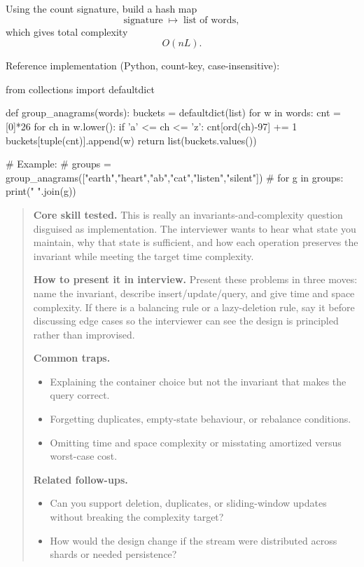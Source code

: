 \documentclass[11pt,letterpaper,openany]{book}
\newenvironment{EditorialNote}
  {\begin{quote}\small\setlength{\parskip}{0.25em}}
  {\end{quote}}
\newcommand{\QuestionSpacer}{\vspace{0.4em}}
\begin{document}
Using the count signature, build a hash map
\[
\text{signature} \;\mapsto\; \text{list of words},
\]
which gives total complexity
\[
O(nL).
\]

Reference implementation (Python, count-key, case-insensitive):
\begin{codeblock}
from collections import defaultdict

def group_anagrams(words):
    buckets = defaultdict(list)
    for w in words:
        cnt = [0]*26
        for ch in w.lower():
            if 'a' <= ch <= 'z':
                cnt[ord(ch)-97] += 1
        buckets[tuple(cnt)].append(w)
    return list(buckets.values())

# Example:
# groups = group_anagrams(["earth","heart","ab","cat","listen","silent"])
# for g in groups: print(" ".join(g))
\end{codeblock}

\begin{EditorialNote}


\textbf{Core skill tested.} This is really an invariants-and-complexity question disguised as implementation. The interviewer wants to hear what state you maintain, why that state is sufficient, and how each operation preserves the invariant while meeting the target time complexity.

\textbf{How to present it in interview.} Present these problems in three moves: name the invariant, describe insert/update/query, and give time and space complexity. If there is a balancing rule or a lazy-deletion rule, say it before discussing edge cases so the interviewer can see the design is principled rather than improvised.

\textbf{Common traps.}
\begin{itemize}
\item Explaining the container choice but not the invariant that makes the query correct.
\item Forgetting duplicates, empty-state behaviour, or rebalance conditions.
\item Omitting time and space complexity or misstating amortized versus worst-case cost.
\end{itemize}

\textbf{Related follow-ups.}
\begin{itemize}
\item Can you support deletion, duplicates, or sliding-window updates without breaking the complexity target?
\item How would the design change if the stream were distributed across shards or needed persistence?
\end{itemize}


\end{EditorialNote}
\QuestionSpacer
\end{document}
